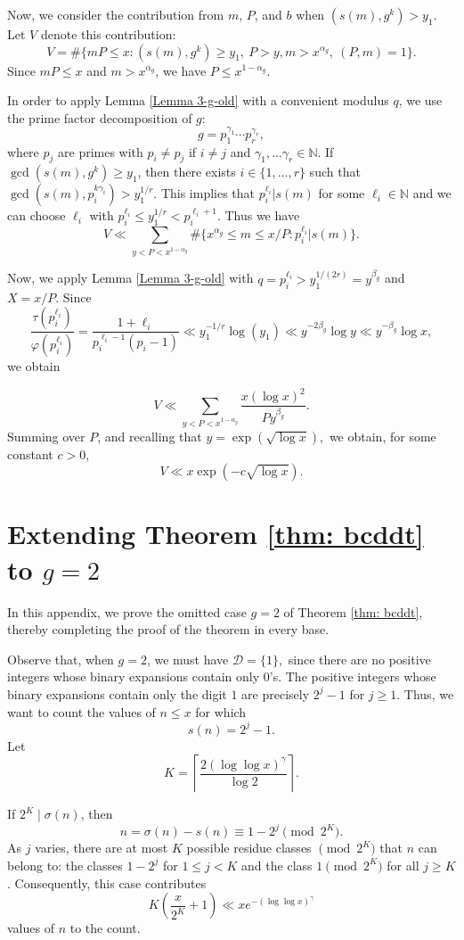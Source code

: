 \documentclass[11pt, reqno]{amsart}
\theoremstyle{remark}
\numberwithin{theorem}{section}
\numberwithin{proposition}{section}
\numberwithin{lemma}{section}
\numberwithin{corollary}{section}
\numberwithin{equation}{section}
\numberwithin{conjecture}{section}
\numberwithin{definition}{section}
\newcommand{\N}{\mathbb{N}}
\begin{document}
Now, we consider the contribution from $m$, $P$, and $b$ when $(s(m), g^{k})>y_{1}$.
Let $V$ denote this contribution:
\[
V=\#\{ mP\le x : (s(m), g^k)\ge y_1,\ P>y, m>x^{\alpha_g},\ (P,m)=1\}.
\]
Since $mP\le x$ and $m>x^{\alpha_g}$, we have $P\le x^{1-\alpha_g}$.


In order to apply Lemma \ref{Lemma 3-g-old} with a convenient modulus $q$, 
 we use the prime factor decomposition of $g$:
$$g=p_1^{\gamma_1}\cdots p_r^{\gamma_r},$$
where $p_j$ are primes with $p_i\not = p_j$ if $i\not =j$ and $\gamma_1,\ldots \gamma_r\in\N$.
If $\gcd(s(m),g^k)\ge y_1$, then there exists $i\in\{ 1,\ldots ,r\}$ such that 
$\gcd(s(m), p_i^{k\gamma_i})>y_1^{1/r}$. This implies that $p_i^{\ell_i} |s(m)$ for some $\ell_i\in \mathbb{N}$ and we can choose $\ell_i$ with $p_i^{\ell_i}\le y_1^{1/r}<p_i^{\ell_i +1}$.
Thus we have
\[
V\ll \sum_{y<P<x^{1-\alpha_g}}\#\{ x^{\alpha_g} \le m\le x/P : p_i^{\ell _i}|s(m)\}.
\]

Now, we apply  Lemma \ref{Lemma 3-g-old} with $q=p_i^{\ell_i}>y_1^{1/(2r)}=y^{\beta_g}$ and $X=x/P$.
Since $$\frac{\tau (p_i^{\ell_i})}{\varphi (p_i^{\ell _i})} =\frac{1+\ell_i}{p_i^{\ell_i -1}(p_i-1)}\ll  y_1^{-1/r}\log (y_1)\ll y^{-2\beta_g}\log y\ll y^{-\beta_g}\log x,$$ we obtain

\[
V\ll \sum_{y<P<x^{1-\alpha_g}} \frac{x (\log x)^2}{P y^{\beta_g}}.
\]
Summing over $P$, and recalling that $y=\exp(\sqrt{\log x}),$ we obtain, for some constant $c>0$, 
\[
V\ll x\exp{(-c\sqrt{\log x})}.
\]

\appendix

\section{Extending Theorem \ref{thm: bcddt} to $g = 2$}\label{appendix}

In this appendix, we prove the omitted case $g=2$ of Theorem \ref{thm: bcddt}, thereby completing the proof of the theorem in every base.

Observe that, when $g = 2$, we must have $\mathcal{D} = \{1\},$ since there are no positive integers whose binary expansions contain only $0$'s. The positive integers whose binary expansions contain only the digit $1$ are precisely $2^{j} - 1$ for $j \geq 1.$ Thus, we want to count the values of $n \leq x$ for which $$s(n) = 2^j-1.$$ Let $$ K = \left\lceil \frac{2(\log\log x)^\gamma}{\log 2}\right\rceil.$$

If $2^K \mid \sigma(n)$, then $$n = \sigma(n) - s(n) \equiv 1 - 2^j \pmod{2^K}.$$ As $j$ varies, there are at most $K$ possible residue classes $\pmod{2^K}$ that $n$ can belong to: the classes $1 - 2^j$ for $1 \leq j < K$ and the class $1 \pmod{2^K}$ for all $j \geq K$. Consequently, this case contributes $$K \left(\frac{x}{2^K} + 1\right) \ll xe^{-(\log\log x)^\gamma}$$ values of $n$ to the count.
\end{document}
